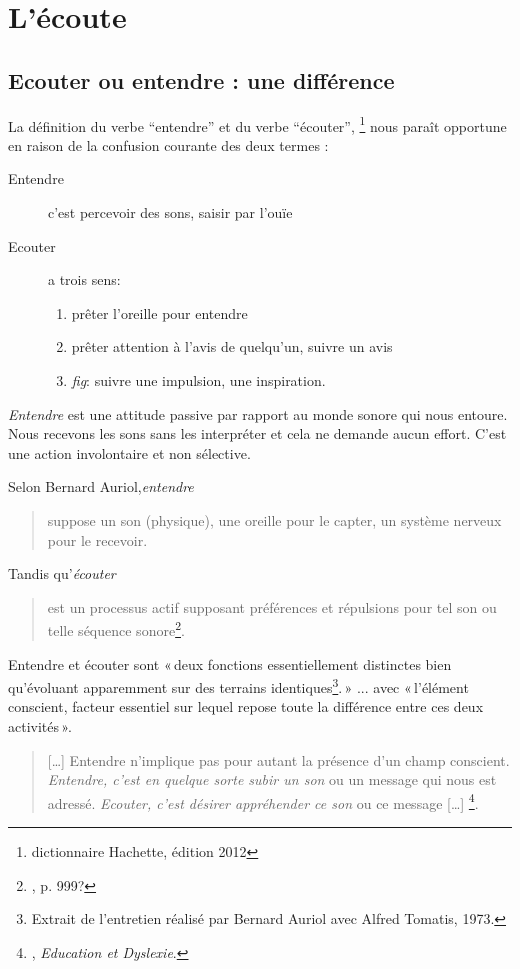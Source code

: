 \chapter{L'écoute}

\section{Ecouter ou entendre : une différence}

La définition du verbe ``entendre'' et du verbe ``écouter'', 
\footnote{dictionnaire Hachette, édition 2012 } nous paraît opportune %
en raison de la confusion courante des deux termes :
\begin{description}
\item[Entendre] c'est  percevoir des sons, saisir par l'ouïe
\item[Ecouter] a trois sens: 
\begin{enumerate}
	\item prêter l'oreille pour entendre
	\item prêter attention
	à l'avis de quelqu'un, suivre un avis
	\item \emph{fig}: suivre une impulsion,
	une inspiration.
\end{enumerate}
\end{description}



\emph{Entendre} est une attitude passive par rapport au monde sonore
qui nous entoure. Nous recevons les sons sans les interpréter et cela
ne demande aucun effort. C'est une action involontaire et non
sélective. 

Selon Bernard Auriol,\textit{entendre} 
\begin{quote}
	suppose un son (physique), une oreille
	pour le capter, un système nerveux pour le recevoir.
\end{quote} 
Tandis qu'\textit{écouter}
\begin{quote}
	est un
	processus actif supposant préférences et répulsions pour tel son ou
	telle séquence sonore\footnote{\cite{auriol:cle}, p. 999?}.
\end{quote}


Entendre et écouter sont «\,deux
fonctions essentiellement distinctes bien qu'évoluant apparemment sur
des terrains identiques\footnote{Extrait de l'entretien réalisé par
	Bernard Auriol avec Alfred Tomatis, 1973.}.\,» ... avec «\,l'élément conscient, facteur essentiel sur lequel repose toute la
différence entre ces deux activités\,».
\begin{quote}
	[\ldots] Entendre n'implique pas pour autant la présence d'un champ
	conscient.\emph{ Entendre, c\textquoteright est en quelque sorte subir
		un son }ou un message qui nous est adressé. \emph{Ecouter, c'est désirer appréhender ce son} ou ce message [\ldots]%
	\footnote{\cite{tomatis:education}, \textsl{Education et Dyslexie}.}.	
\end{quote}


